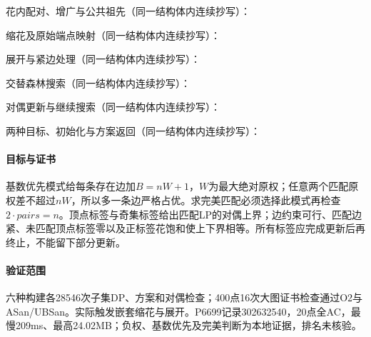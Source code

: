 花内配对、增广与公共祖先（同一结构体内连续抄写）：



\newpage

缩花及原始端点映射（同一结构体内连续抄写）：



\newpage

展开与紧边处理（同一结构体内连续抄写）：



\newpage

交替森林搜索（同一结构体内连续抄写）：



\newpage

对偶更新与继续搜索（同一结构体内连续抄写）：



\newpage

两种目标、初始化与方案返回（同一结构体内连续抄写）：



\newpage

\paragraph{目标与证书} 基数优先模式给每条存在边加$B=nW+1$，$W$为最大绝对原权；任意两个匹配原权差不超过$nW$，所以多一条边严格占优。求完美匹配必须选择此模式再检查$2\cdot pairs=n$。顶点标签与奇集标签给出匹配LP的对偶上界；边约束可行、匹配边紧、未匹配顶点标签零以及正标签花饱和使上下界相等。所有标签应完成更新后再终止，不能留下部分更新。

\paragraph{验证范围} 六种构建各28546次子集DP、方案和对偶检查；400点16次大图证书检查通过O2与ASan/UBSan。实际触发嵌套缩花与展开。P6699记录302632540，20点全AC，最慢209ms、最高24.02MB；负权、基数优先及完美判断为本地证据，排名未核验。

